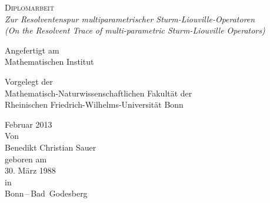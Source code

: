 \documentclass[paper=a4,twoside,parskip=full,bibliography=totoc]{scrartcl}
\author{Benedikt Christian Sauer}
\title{\Thema}
\numberwithin{equation}{section}
\numberwithin{Corollary}{section}
\numberwithin{Lemma}{section}
\numberwithin{Theorem}{section}
\newcommand{\EmptyPage}{\thispagestyle{empty}\mbox{}\newpage}
\newcommand{\Thema}{Zur Resolventenspur multiparametrischer
Sturm-Liouville-Operatoren}
\newcommand{\ThemaEn}{On the Resolvent Trace of multi-parametric Sturm-Liouville
Operators}
\begin{document}
\begin{titlepage}
  \begin{center}
      \textsc{Diplomarbeit} \\
      \bigskip
      \textit{\Thema} \\
      \textit{(\ThemaEn)}
  \end{center}
  \begin{center}
      Angefertigt am \\
      Mathematischen Institut
  \end{center}
  \begin{center}
      Vorgelegt der \\
      Mathematisch-Naturwissenschaftlichen Fakultät der \\
      Rheinischen Friedrich-Wilhelms-Universität Bonn
  \end{center}
  \begin{center}
      Februar 2013 \\
      \bigskip
      Von \\
      \bigskip
      Benedikt Christian Sauer \\
      \bigskip
      geboren am \\
      30. März 1988 \\
      in \\
      Bonn\,--\,Bad~Godesberg
  \end{center}
\end{titlepage}
\newpage
\EmptyPage
\thispagestyle{empty}
\end{document}
